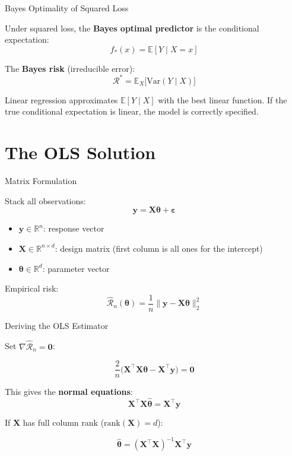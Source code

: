 \documentclass[aspectratio=169, professionalfonts]{beamer}
\def\R{\mathbb{R}}
\def\E{\mathbb{E}}
\def\Var{\text{Var}}
\begin{document}
\begin{frame}{Bayes Optimality of Squared Loss}

Under squared loss, the \textbf{Bayes optimal predictor} is the
conditional expectation:
$$f_*(x) = \E[Y \mid X = x]$$

\bigskip

The \textbf{Bayes risk} (irreducible error):
$$\mathcal{R}^* = \E_X\!\bigl[\Var(Y \mid X)\bigr]$$

\bigskip

Linear regression approximates $\E[Y \mid X]$ with the best
linear function. If the true conditional expectation is linear,
the model is correctly specified.

\end{frame}

\section{The OLS Solution}

\begin{frame}{Matrix Formulation}

Stack all observations:
$$\mathbf{y} = \mathbf{X}\bm{\theta} + \bm{\varepsilon}$$

\begin{itemize}
  \item $\mathbf{y} \in \R^n$: response vector
  \item $\mathbf{X} \in \R^{n \times d}$: design matrix
        (first column is all ones for the intercept)
  \item $\bm{\theta} \in \R^d$: parameter vector
\end{itemize}

\bigskip

Empirical risk:
$$\hat{\mathcal{R}}_n(\bm{\theta})
  = \frac{1}{n}\|\mathbf{y} - \mathbf{X}\bm{\theta}\|_2^2$$

\end{frame}

\begin{frame}{Deriving the OLS Estimator}

Set $\nabla\hat{\mathcal{R}}_n = \mathbf{0}$:

$$\frac{2}{n}\bigl(\mathbf{X}^\top\mathbf{X}\bm{\theta}
  - \mathbf{X}^\top\mathbf{y}\bigr) = \mathbf{0}$$

\bigskip

This gives the \textbf{normal equations}:
$$\mathbf{X}^\top\mathbf{X}\hat{\bm{\theta}}
  = \mathbf{X}^\top\mathbf{y}$$

\bigskip

If $\mathbf{X}$ has full column rank ($\text{rank}(\mathbf{X}) = d$):

$$\boxed{\hat{\bm{\theta}}
  = (\mathbf{X}^\top\mathbf{X})^{-1}\mathbf{X}^\top\mathbf{y}}$$

\end{frame}
\end{document}
